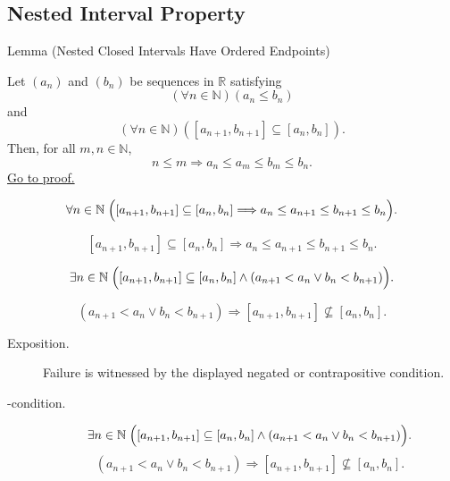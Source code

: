 
\subsection*{Nested Interval Property}

\begin{lemmabox}{Lemma (Nested Closed Intervals Have Ordered Endpoints)}
\begin{lemma}
\label{lem:nested-closed-intervals-have-ordered-endpoints}
Let $(a_n)$ and $(b_n)$ be sequences in $\mathbb{R}$ satisfying
\[
  (\forall n\in\mathbb{N})(a_n\leq b_n)
\]
and
\[
  (\forall n\in\mathbb{N})([a_{n+1},b_{n+1}]\subseteq [a_n,b_n]).
\]
Then, for all $m,n\in\mathbb{N}$,
\[
  n\leq m
  \Longrightarrow
  a_n\leq a_m\leq b_m\leq b_n.
\]
\hyperref[prf:nested-closed-intervals-have-ordered-endpoints]{Go to proof.}
\end{lemma}
\end{lemmabox}

\begin{remark*}
\[
\forall n\in\mathbb{N}\;
\Bigl([a_{n+1},b_{n+1}]\subseteq [a_n,b_n]
\Longrightarrow
a_n\le a_{n+1}\le b_{n+1}\le b_n\Bigr).
\]
\end{remark*}

\begin{remark*}
\[
[a_{n+1},b_{n+1}]\subseteq [a_n,b_n]
\Longrightarrow
a_n\le a_{n+1}\le b_{n+1}\le b_n.
\]
\end{remark*}

\begin{remark*}
\[
\exists n\in\mathbb{N}\;
\Bigl([a_{n+1},b_{n+1}]\subseteq [a_n,b_n]\land
(a_{n+1}<a_n\lor b_n<b_{n+1})\Bigr).
\]
\end{remark*}

\begin{remark*}
\[
(a_{n+1}<a_n\lor b_n<b_{n+1})
\Longrightarrow
[a_{n+1},b_{n+1}]\not\subseteq [a_n,b_n].
\]
\end{remark*}

\begin{remark*}
\begin{description}
  \item[Exposition.]
  Failure is witnessed by the displayed negated or contrapositive condition.

  \item[\exists-condition.]
  \[
\exists n\in\mathbb{N}\;
\Bigl([a_{n+1},b_{n+1}]\subseteq [a_n,b_n]\land
(a_{n+1}<a_n\lor b_n<b_{n+1})\Bigr).
\]
\[
(a_{n+1}<a_n\lor b_n<b_{n+1})
\Longrightarrow
[a_{n+1},b_{n+1}]\not\subseteq [a_n,b_n].
\]
\end{description}
\end{remark*}

